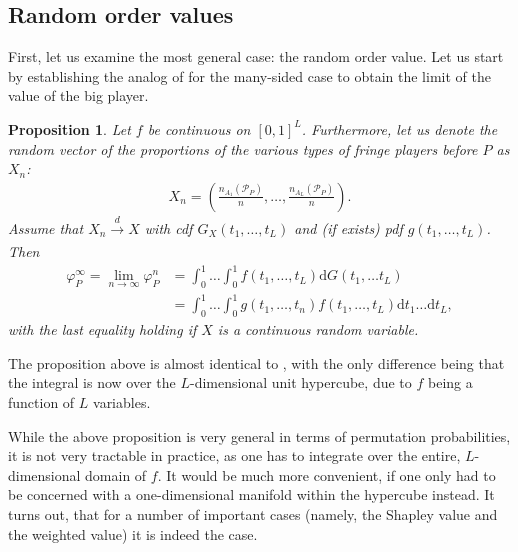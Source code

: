 \documentclass[a4paper]{article}
\newtheorem{proposition}{Proposition}
\newcommand{\dt}{\mathrm{d}t}
\newcommand{\dG}{\mathrm{d}G}
\begin{document}
\subsection{Random order values}

First, let us examine the most general case: the random order value.
Let us start by establishing the analog of  for the many-sided case to obtain the limit of the value of the big player.
\begin{proposition}
    \label{prop:many_sided_general}
    Let $f$ be continuous on $[0, 1]^L$. Furthermore, let us denote the random vector of the proportions of the various types of fringe players before $P$ as $X_n$:
    \begin{align*}
        X_n = \left( \frac{n_{A_1}(\mathcal{P}_P)}{n}, \dots, \frac{n_{A_L}(\mathcal{P}_P)}{n} \right).
    \end{align*}
    Assume that $X_n \xrightarrow[]{d} X$ with cdf $G_X(t_1, \dots, t_L)$ and (if exists) pdf $g(t_1, \dots, t_L)$.
    Then
    \begin{align*}
        \varphi_P^\infty = \lim_{n \to \infty} \varphi_P^n &= \int_0^1 \dots \int_0^1 f(t_1, \dots, t_L) \dG(t_1, \dots t_L) \\
        &= \int_0^1\dots \int_0^1 g(t_1, \dots, t_n) f(t_1, \dots, t_L) \dt_1 \dots \dt_L,
    \end{align*}
    with the last equality holding if $X$ is a continuous random variable.
\end{proposition}
The proposition above is almost identical to , with the only difference being that the integral is now over the $L$-dimensional unit hypercube, due to $f$ being a function of $L$ variables.

While the above proposition is very general in terms of permutation probabilities, it is not very tractable in practice, as one has to integrate over the entire, $L$-dimensional domain of $f$.
It would be much more convenient, if one only had to be concerned with a one-dimensional manifold within the hypercube instead.
It turns out, that for a number of important cases (namely, the Shapley value and the weighted value) it is indeed the case.
\end{document}
